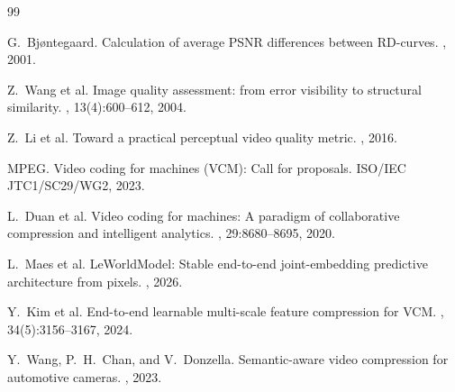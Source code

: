 \documentclass{article}
\begin{document}
\begin{thebibliography}{99}

G.~Bj{\o}ntegaard.
\newblock Calculation of average PSNR differences between RD-curves.
, 2001.

Z.~Wang et al.
\newblock Image quality assessment: from error visibility to structural similarity.
, 13(4):600--612, 2004.

Z.~Li et al.
\newblock Toward a practical perceptual video quality metric.
, 2016.

MPEG.
\newblock Video coding for machines (VCM): Call for proposals.
\newblock ISO/IEC JTC1/SC29/WG2, 2023.

L.~Duan et al.
\newblock Video coding for machines: A paradigm of collaborative compression and intelligent analytics.
, 29:8680--8695, 2020.

L.~Maes et al.
\newblock LeWorldModel: Stable end-to-end joint-embedding predictive architecture from pixels.
, 2026.

Y.~Kim et al.
\newblock End-to-end learnable multi-scale feature compression for VCM.
, 34(5):3156--3167, 2024.

Y.~Wang, P.~H.~Chan, and V.~Donzella.
\newblock Semantic-aware video compression for automotive cameras.
, 2023.

\end{thebibliography}
\end{document}

